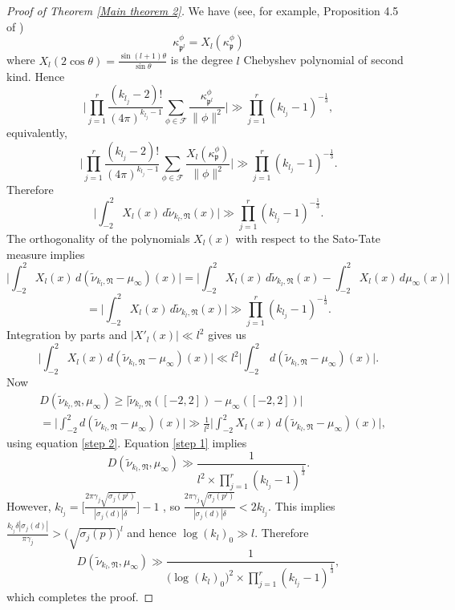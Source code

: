 \documentclass[reqno]{amsart}
\theoremstyle{plain}
\theoremstyle{definition}
\theoremstyle{remark}
\def\log{\operatorname{log}}
\begin{document}
\begin{proof}[Proof of Theorem \ref{Main theorem 2}]
We have (see, for example, Proposition 4.5 of \cite{KL})
$$\kappa^\phi_{\mathfrak{p}^l}=X_l(\kappa^\phi_{\mathfrak{p}})$$
where $X_l(2 \cos \theta)=\frac{\sin(l+1)\theta}{\sin \theta}$ is the degree $l$ Chebyshev polynomial of second kind. Hence
$$ \Bigg|\prod_{j=1}^r  \frac{(k_{l_j}-2)!}{(4\pi)^{k_{l_j}-1} }
\sum_{{\phi}\in \mathcal{F} }\frac{\kappa^\phi_{\mathfrak{p}^l} }{\|\phi \|^2}\Bigg|
\gg\prod_{j=1}^r (k_{l_j}-1)^{-\frac{1}{3}},
 $$
  equivalently,
$$ \Bigg|\prod_{j=1}^r  \frac{(k_{l_j}-2)!}{(4\pi)^{k_{l_j}-1} }
\sum_{{\phi}\in \mathcal{F} }\frac{X_l(\kappa^\phi_{\mathfrak{p}}) }{ \| \phi \|^2}\Bigg|
\gg \prod_{j=1}^r (k_{l_j}-1)^{-\frac{1}{3}}.
 $$
Therefore 
$$\Bigg|\int_{-2}^2 X_l(x) \, d\tilde{\nu}_{k_l,\mathfrak{N}}(x)\Bigg|   \gg \prod_{j=1}^r (k_{l_j}-1)^{-\frac{1}{3}}.
$$
The orthogonality of the polynomials $X_{l}(x)$ with respect to the Sato-Tate measure implies 
$$
\Bigg|\int_{-2}^2 X_{l}(x) \, d(\tilde{\nu}_{k_l,\mathfrak{N}}-\mu_\infty)(x) \Bigg| =\Bigg|\int_{-2}^2 X_{l}(x) \, d\tilde{\nu}_{k_l,\mathfrak{N}}(x)  -  \int_{-2}^2X_{l}(x) \, d\mu_\infty(x)\Bigg|$$
\begin{equation}\label{step 1}
=\Bigg|\int_{-2}^2 X_{l}(x) \, d\tilde{\nu}_{k_l,\mathfrak{N}}(x)\Bigg|\gg  \prod_{j=1}^r (k_{l_j}-1)^{-\frac{1}{3}}.
\end{equation}
Integration by parts and $\Big| X'_l(x)\Big|\ll l^2$  gives us 
\begin{equation}\label{step 2}
\Bigg|\int_{-2}^2 X_{l}(x) \, d(\tilde{\nu}_{k_l,\mathfrak{N}}-\mu_\infty)(x)\Bigg|
\ll  l^2\Bigg|  \int_{-2}^2  \, d(\tilde{\nu}_{k_l,\mathfrak{N}}-\mu_\infty)(x)  \Bigg|.
\end{equation}
Now 
\begin{align*} &D(\tilde{\nu}_{k_l,\mathfrak{N}},\mu_\infty)\geq \Bigg|\tilde{\nu}_{k_l,\mathfrak{N}}([-2,2])-\mu_\infty([-2,2])\Bigg| \\&= \Bigg|\int_{-2}^2 d(\tilde{\nu}_{k_l,\mathfrak{N}}-\mu_\infty)(x)\Bigg|\gg
\frac{1}{l^2} \Bigg|\int_{-2}^2 X_l(x) \, d(\tilde{\nu}_{k_l,\mathfrak{N}}-\mu_\infty)(x)\Bigg|,
\end{align*}
using equation \eqref{step 2}.
Equation \eqref{step 1}  implies
$$ 
D(\tilde{\nu}_{k_l,\mathfrak{N}},\mu_\infty)\gg\frac{1}{l^2\times\prod_{j=1}^r (k_{l_j}-1)^{\frac{1}{3}}}.
$$
However, $k_{l_j}=\Big[\frac{2\pi \gamma_j\sqrt{\sigma_{j}({p}^l)}}{|\sigma_j(d)|\delta}\Big]-1$ , so  $\frac{2\pi \gamma_j\sqrt{\sigma_{j}({p}^l)}}{|\sigma_j(d)|\delta}<2k_{l_j}. $ This implies $\frac{k_{l_j}\delta|\sigma_j(d)|}{\pi\gamma_j}>\big(\sqrt{\sigma_{j}({p})}\big)^l$ and hence $\log (k_{l})_0 \gg l$.
 Therefore 
 $$D(\tilde{\nu}_{k_l,\mathfrak{N}},\mu_\infty)\gg\frac{1}{\big(  \log (k_{l})_0 \big)^2  \times\prod_{j=1}^r (k_{l_j}-1)^{\frac{1}{3}}    },
 $$
which completes the proof. 
\end{proof}
\end{document}
